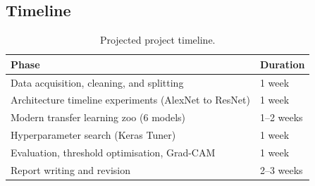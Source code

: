 \subsection{Timeline}

\begin{table}[H]
\centering
\caption{Projected project timeline.}
\label{tab:timeline}
\begin{tabular}{ll}
\toprule
\textbf{Phase} & \textbf{Duration} \\
\midrule
Data acquisition, cleaning, and splitting & 1 week \\
Architecture timeline experiments (AlexNet to ResNet) & 1 week \\
Modern transfer learning zoo (6 models) & 1--2 weeks \\
Hyperparameter search (Keras Tuner) & 1 week \\
Evaluation, threshold optimisation, Grad-CAM & 1 week \\
Report writing and revision & 2--3 weeks \\
\bottomrule
\end{tabular}
\end{table}

